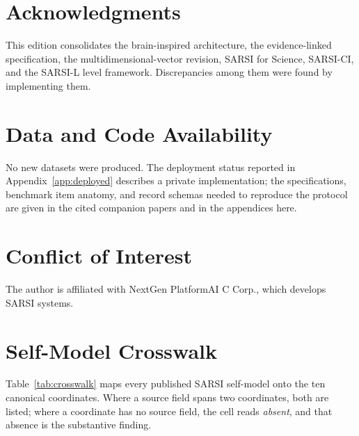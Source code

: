 \documentclass[11pt]{article}
\begin{document}
\section*{Acknowledgments}
This edition consolidates the brain-inspired architecture, the evidence-linked specification, the multidimensional-vector revision, SARSI for Science, SARSI-CI, and the SARSI-L level framework. Discrepancies among them were found by implementing them.

\section*{Data and Code Availability}
No new datasets were produced. The deployment status reported in Appendix~\ref{app:deployed} describes a private implementation; the specifications, benchmark item anatomy, and record schemas needed to reproduce the protocol are given in the cited companion papers and in the appendices here.

\section*{Conflict of Interest}
The author is affiliated with NextGen PlatformAI C Corp., which develops SARSI systems.

\appendix

\section{Self-Model Crosswalk}
\label{app:crosswalk}

Table~\ref{tab:crosswalk} maps every published SARSI self-model onto the ten canonical coordinates. Where a source field spans two coordinates, both are listed; where a coordinate has no source field, the cell reads \emph{absent}, and that absence is the substantive finding.
\end{document}
